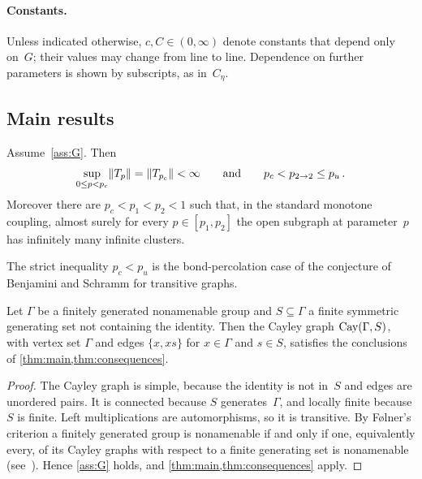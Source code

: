 \paragraph{Constants.}
Unless indicated otherwise, $c,C\in(0,\infty)$ denote constants that depend only on~$G$; their values
may change from line to line. Dependence on further parameters is shown by subscripts, as in~$C_\eta$.

\subsection{Main results}\label{sec:main-results}

\begin{theorem}\label{thm:main}
Assume~\cref{ass:G}. Then
\begin{equation}\label{eq:main}
  \sup_{0\le p<p_c}\lVert T_p\rVert=\lVert T_{p_c}\rVert<\infty
  \qquad\text{and}\qquad
  p_c<p_{2\to 2}\le p_u\,.
\end{equation}
Moreover there are $p_c<p_1<p_2<1$ such that, in the standard monotone coupling, almost surely for
every $p\in[p_1,p_2]$ the open subgraph at parameter~$p$ has infinitely many infinite clusters.
\end{theorem}

The strict inequality $p_c<p_u$ is the bond-percolation case of the conjecture of Benjamini and
Schramm for transitive graphs.

\begin{corollary}\label{cor:cayley}
Let $\Gamma$ be a finitely generated nonamenable group and $S\subseteq\Gamma$ a finite symmetric
generating set not containing the identity. Then the Cayley graph $\operatorname{Cay}(\Gamma,S)$, with vertex set
$\Gamma$ and edges $\{x,xs\}$ for $x\in\Gamma$ and $s\in S$, satisfies the conclusions of
\cref{thm:main,thm:consequences}.
\end{corollary}

\begin{proof}
The Cayley graph is simple, because the identity is not in~$S$ and edges are unordered pairs. It is
connected because $S$ generates~$\Gamma$, and locally finite because $S$ is finite. Left
multiplications are automorphisms, so it is transitive. By F{\o}lner's criterion a finitely generated
group is nonamenable if and only if one, equivalently every, of its Cayley graphs with respect to a
finite generating set is nonamenable (see~\cite[Chapter~6]{LP16}). %
Hence \cref{ass:G} holds, and \cref{thm:main,thm:consequences} apply.
\end{proof}

